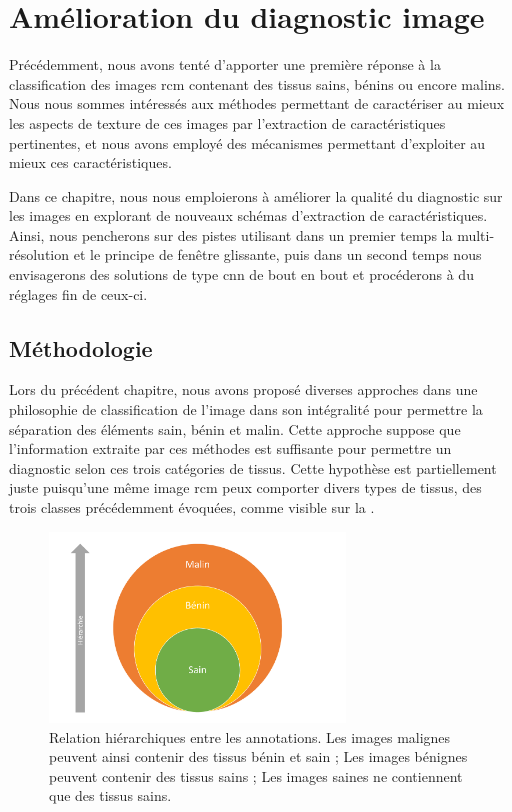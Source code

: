 \chapter{Amélioration du diagnostic image}
\label{chap:chapter_5}
\chapterintro
Précédemment, nous avons tenté d'apporter une première réponse à la classification des images \gls{rcm} contenant des tissus sains, bénins ou encore malins. Nous nous sommes intéressés aux méthodes permettant de caractériser au mieux les aspects de texture de ces images par l'extraction de caractéristiques pertinentes, et nous avons employé des mécanismes permettant d'exploiter au mieux ces caractéristiques.\par

Dans ce chapitre, nous nous emploierons à améliorer la qualité du diagnostic sur les images en explorant de nouveaux schémas d'extraction de caractéristiques. Ainsi, nous pencherons sur des pistes utilisant dans un premier temps la multi-résolution et le principe de fenêtre glissante, puis dans un second temps nous envisagerons des solutions de type \gls{cnn} de bout en bout et procéderons à du réglages fin de ceux-ci.\par

\newpage

\section{Méthodologie}
Lors du précédent chapitre, nous avons proposé diverses approches dans une philosophie de classification de l'image dans son intégralité pour permettre la séparation des éléments sain, bénin et malin. Cette approche suppose que l'information extraite par ces méthodes est suffisante pour permettre un diagnostic selon ces trois catégories de tissus. Cette hypothèse est partiellement juste puisqu'une même image \gls{rcm} peux comporter divers types de tissus, des trois classes précédemment évoquées, comme visible sur la .\par

\begin{figure}[H]
    \centering
    \includegraphics[width=0.7\textwidth]{contents/chapter_5/resources/scheme_annotations_hierarchy.pdf}
    \caption{Relation hiérarchiques entre les annotations. Les images malignes peuvent ainsi contenir des tissus bénin et sain ; Les images bénignes peuvent contenir des tissus sains ; Les images saines ne contiennent que des tissus sains.}
    \label{fig:scheme_annotations_hierarchy}
\end{figure}\par

